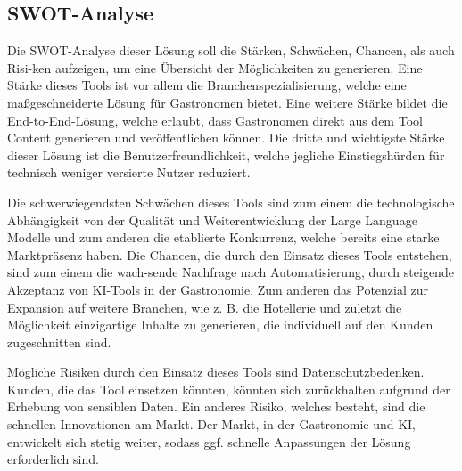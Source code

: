 \subsection{SWOT-Analyse}
Die SWOT-Analyse dieser Lösung soll die Stärken, Schwächen, Chancen, als auch Risi-ken aufzeigen, um eine Übersicht der Möglichkeiten zu generieren.
Eine Stärke dieses Tools ist vor allem die Branchenspezialisierung, welche eine maßgeschneiderte Lösung für Gastronomen bietet.
Eine weitere Stärke bildet die End-to-End-Lösung, welche erlaubt, dass Gastronomen direkt aus dem Tool Content generieren und veröffentlichen können.
Die dritte und wichtigste Stärke dieser Lösung ist die Benutzerfreundlichkeit, welche jegliche Einstiegshürden für technisch weniger versierte Nutzer reduziert.

Die schwerwiegendsten Schwächen dieses Tools sind zum einem die technologische Abhängigkeit von der Qualität und Weiterentwicklung der Large Language Modelle und zum anderen die etablierte Konkurrenz, welche bereits eine starke Marktpräsenz haben.
Die Chancen, die durch den Einsatz dieses Tools entstehen, sind zum einem die wach-sende Nachfrage nach Automatisierung, durch steigende Akzeptanz von KI-Tools in der Gastronomie.
Zum anderen das Potenzial zur Expansion auf weitere Branchen, wie z. B. die Hotellerie und zuletzt die Möglichkeit einzigartige Inhalte zu generieren, die individuell auf den Kunden zugeschnitten sind.

Mögliche Risiken durch den Einsatz dieses Tools sind Datenschutzbedenken.
Kunden, die das Tool einsetzen könnten, könnten sich zurückhalten aufgrund der Erhebung von sensiblen Daten.
Ein anderes Risiko, welches besteht, sind die schnellen Innovationen am Markt.
Der Markt, in der Gastronomie und KI, entwickelt sich stetig weiter, sodass ggf. schnelle Anpassungen der Lösung erforderlich sind.

